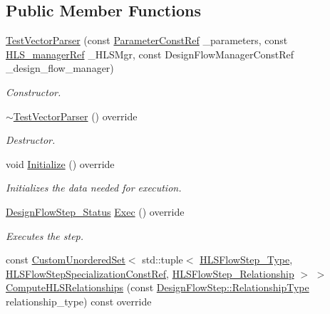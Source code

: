 \subsection*{Public Member Functions}
\begin{DoxyCompactItemize}
\item 
\hyperlink{classTestVectorParser_a9a879310446467aa26d063b61ead983e}{Test\+Vector\+Parser} (const \hyperlink{Parameter_8hpp_a37841774a6fcb479b597fdf8955eb4ea}{Parameter\+Const\+Ref} \+\_\+parameters, const \hyperlink{hls__manager_8hpp_acd3842b8589fe52c08fc0b2fcc813bfe}{H\+L\+S\+\_\+manager\+Ref} \+\_\+\+H\+L\+S\+Mgr, const Design\+Flow\+Manager\+Const\+Ref \+\_\+design\+\_\+flow\+\_\+manager)
\begin{DoxyCompactList}\small\item\em Constructor. \end{DoxyCompactList}\item 
\hyperlink{classTestVectorParser_a517254f8072a45d179287ebb6125fef7}{$\sim$\+Test\+Vector\+Parser} () override
\begin{DoxyCompactList}\small\item\em Destructor. \end{DoxyCompactList}\item 
void \hyperlink{classTestVectorParser_aa48917a5ac5ec20341754ec35edd6b3a}{Initialize} () override
\begin{DoxyCompactList}\small\item\em Initializes the data needed for execution. \end{DoxyCompactList}\item 
\hyperlink{design__flow__step_8hpp_afb1f0d73069c26076b8d31dbc8ebecdf}{Design\+Flow\+Step\+\_\+\+Status} \hyperlink{classTestVectorParser_a88660488c77a6d59a68893a4e74cf662}{Exec} () override
\begin{DoxyCompactList}\small\item\em Executes the step. \end{DoxyCompactList}\item 
const \hyperlink{classCustomUnorderedSet}{Custom\+Unordered\+Set}$<$ std\+::tuple$<$ \hyperlink{hls__step_8hpp_ada16bc22905016180e26fc7e39537f8d}{H\+L\+S\+Flow\+Step\+\_\+\+Type}, \hyperlink{hls__step_8hpp_a5fdd2edf290c196531d21d68e13f0e74}{H\+L\+S\+Flow\+Step\+Specialization\+Const\+Ref}, \hyperlink{hls__step_8hpp_a3ad360b9b11e6bf0683d5562a0ceb169}{H\+L\+S\+Flow\+Step\+\_\+\+Relationship} $>$ $>$ \hyperlink{classTestVectorParser_a5aff1be837995418f60502e97b03f363}{Compute\+H\+L\+S\+Relationships} (const \hyperlink{classDesignFlowStep_a723a3baf19ff2ceb77bc13e099d0b1b7}{Design\+Flow\+Step\+::\+Relationship\+Type} relationship\+\_\+type) const override

\end{DoxyCompactItemize}
